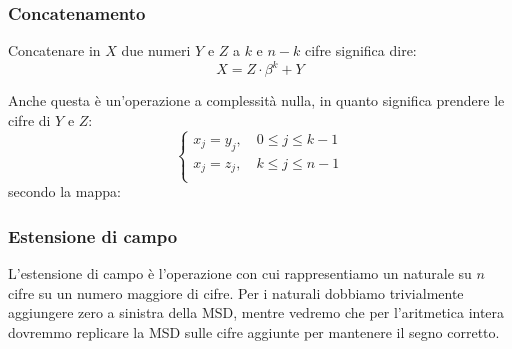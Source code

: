 \documentclass[a4paper,11pt]{article}
\begin{document}
\subsubsection{Concatenamento}
Concatenare in $X$ due numeri $Y$ e $Z$ a $k$ e $n-k$ cifre significa dire:
$$ 
X = Z \cdot \beta^k + Y
$$

Anche questa è un'operazione a complessità nulla, in quanto significa prendere le cifre di $Y$ e $Z$:
\[
	\begin{cases}
		x_j = y_j, \quad 0 \leq j \leq k - 1\\ 	
		x_j = z_j, \quad k \leq j \leq n - 1 \\ 	
	\end{cases}
\]
secondo la mappa:
\begin{center}
\end{center}

\subsubsection{Estensione di campo}
L'estensione di campo è l'operazione con cui rappresentiamo un naturale su $n$ cifre su un numero maggiore di cifre.
Per i naturali dobbiamo trivialmente aggiungere zero a sinistra della MSD, mentre vedremo che per l'aritmetica intera dovremmo replicare la MSD sulle cifre aggiunte per mantenere il segno corretto.
\end{document}

